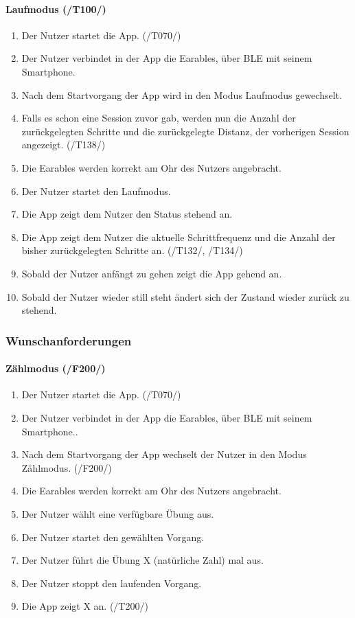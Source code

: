 \documentclass[a4paper,12pt]{article}
\begin{document}
      \paragraph{Laufmodus (/T100/)}
      \begin{enumerate}
        \item Der Nutzer startet die App. (/T070/)
        \item Der Nutzer verbindet in der App die \gls{Earables}, über \gls{BLE} mit seinem Smartphone.
        \item Nach dem Startvorgang der App wird in den Modus \glqq Laufmodus\grqq{} gewechselt.
        \item Falls es schon eine Session zuvor gab, werden nun die Anzahl der zurückgelegten Schritte und die zurückgelegte Distanz, der vorherigen Session angezeigt. (/T138/)
        \item Die \Gls{Earables} werden korrekt am Ohr des Nutzers angebracht.
        \item Der Nutzer startet den Laufmodus.
        \item Die App zeigt dem Nutzer den Status \glqq stehend\grqq{} an.
        \item Die App zeigt dem Nutzer die aktuelle \gls{Schrittfrequenz} und die Anzahl der bisher zurückgelegten Schritte an. (/T132/, /T134/)
        \item Sobald der Nutzer anfängt zu gehen zeigt die App \glqq gehend\grqq{} an.
        \item Sobald der Nutzer wieder still steht ändert sich der Zustand wieder zurück zu \glqq stehend\grqq. 
      \end{enumerate}

    \subsubsection{Wunschanforderungen}

    
    \paragraph{Zählmodus (/F200/)}
      \begin{enumerate}
        \item Der Nutzer startet die App. (/T070/)
        \item Der Nutzer verbindet in der App die \gls{Earables}, über \gls{BLE} mit seinem Smartphone..
        \item Nach dem Startvorgang der App wechselt der Nutzer in den Modus \glqq Zählmodus\grqq . (/F200/)
        \item Die \Gls{Earables} werden korrekt am Ohr des Nutzers angebracht.
        \item Der Nutzer wählt eine verfügbare Übung aus. 
        \item Der Nutzer startet den gewählten \Gls{Vorgang}.
        \item Der Nutzer führt die Übung X (natürliche Zahl) mal aus.
        \item Der Nutzer stoppt den laufenden \Gls{Vorgang}.
        \item Die App zeigt X an. (/T200/)
      \end{enumerate}
\end{document}
